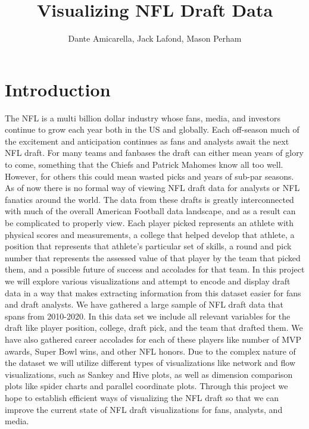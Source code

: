 \documentclass{proc}
\begin{document}
\title{Visualizing NFL Draft Data}

\author{Dante Amicarella, Jack Lafond, Mason Perham}

\maketitle

\section{Introduction}
The NFL is a multi billion dollar industry whose fans, media, and investors continue to grow each year both in the US and globally. Each off-season much of the excitement and anticipation continues as fans and analysts await the next NFL draft. For many teams and fanbases the draft can either mean years of glory to come, something that the Chiefs and Patrick Mahomes know all too well. However, for others this could mean wasted picks and years of sub-par seasons. 
As of now there is no formal way of viewing NFL draft data for analysts or NFL fanatics around the world. The data from these drafts is greatly interconnected with much of the overall American Football data landscape, and as a result can be complicated to properly view. Each player picked represents an athlete with physical scores and measurements, a college that helped develop that athlete, a position that represents that athlete's particular set of skills, a round and pick number that represents the assessed value of that player by the team that picked them, and a possible future of success and accolades for that team. 
In this project we will explore various visualizations and attempt to encode and display draft data in a way that makes extracting information from this dataset easier for fans and draft analysts. We have gathered a large sample of NFL draft data that spans from 2010-2020. In this data set we include all relevant variables for the draft like player position, college, draft pick, and the team that drafted them. We have also gathered career accolades for each of these players like number of MVP awards, Super Bowl wins, and other NFL honors. Due to the complex nature of the dataset we will utilize different types of visualizations like network and flow visualizations, such as Sankey and Hive plots, as well as dimension comparison plots like spider charts and parallel coordinate plots. 
Through this project we hope to establish efficient ways of visualizing the NFL draft so that we can improve the current state of NFL draft visualizations for fans, analysts, and media.
\end{document}
